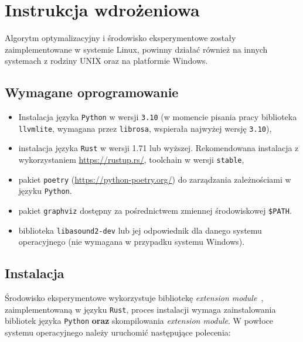 \chapter{Instrukcja wdrożeniowa}

Algorytm optymalizacyjny i środowisko eksperymentowe zostały zaimplementowane
w systemie Linux, powinny działać również na innych systemach z rodziny UNIX
oraz na platformie Windows.

\section{Wymagane oprogramowanie}

\begin{itemize}
  \item Instalacja języka \texttt{Python} w wersji \texttt{3.10} (w momencie pisania
    pracy biblioteka \texttt{llvmlite}, wymagana przez \texttt{librosa}, wspierała najwyżej
    wersję \texttt{3.10}),
  \item instalacja języka \texttt{Rust} w wersji 1.71 lub wyższej.
    Rekomendowana instalacja z wykorzystaniem \url{https://rustup.rs/},
    toolchain w wersji \texttt{stable},
  \item pakiet \texttt{poetry} (\url{https://python-poetry.org/}) do zarządzania zależnościami
    w języku \texttt{Python}.
  \item pakiet \texttt{graphviz} dostępny za pośrednictwem zmiennej środowiskowej \texttt{\$PATH}.
  \item biblioteka \texttt{libasound2-dev} lub jej odpowiednik dla danego
        systemu operacyjnego (nie wymagana w przypadku systemu Windows).
\end{itemize}

\section{Instalacja}

Środowisko eksperymentowe wykorzystuje
bibliotekę \textit{extension module}~\cite{python_extension_module},
zaimplementowaną w języku \texttt{Rust}, proces instalacji wymaga
zainstalowania bibliotek języka \texttt{Python} \textbf{oraz} skompilowania
\textit{extension module}.
W powłoce systemu operacyjnego należy uruchomić następujące polecenia:

